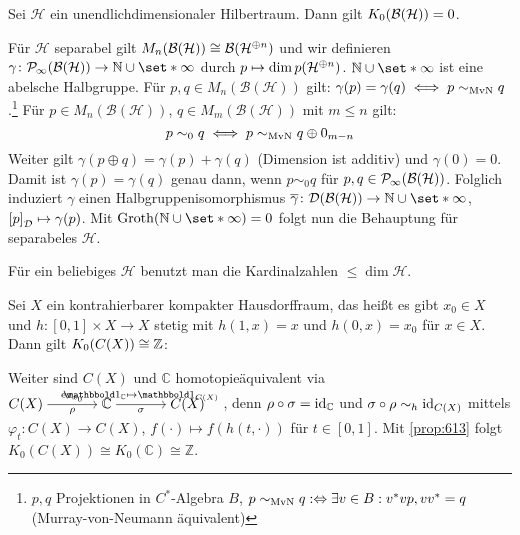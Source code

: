 \begin{beispiel}[label=618]
	Sei $\mathcal{H}$ ein unendlichdimensionaler Hilbertraum. 
	Dann gilt $K_0 \enbrace*{\mathcal{B}(\mathcal{H})}=0$.
\end{beispiel}
\begin{beweis}
	Für $\mathcal{H}$ separabel gilt $M_n(\mathcal{B}(\mathcal{H})) \cong \mathcal{B} \enbrace*{\mathcal{H}^{\oplus n}}$ und wir definieren $\gamma \colon \Pinfty(\mathcal{B}(\mathcal{H})) \to \mathbb{N} \cup \set*{\infty}$ durch $p \mapsto \dim p \enbrace*{\mathcal{H}^{\oplus n}}$.
	$\mathbb{N} \cup \set*{\infty}$ ist eine abelsche Halbgruppe.
	Für $p,q \in M_n(\mathcal{B}(\mathcal{H}))$ gilt: $\gamma(p) = \gamma(q) \iff p \sim_{\MvN} q$.\footnote{$p,q$ Projektionen in $C^*$-Algebra $B$, $p\sim_{\MvN} q : \Leftrightarrow \exists v \in B : v^*vp, vv^*=q$ (Murray-von-Neumann äquivalent)}
	Für $p \in M_n(\mathcal{B}(\mathcal{H}))$, $q \in M_m(\mathcal{B}(\mathcal{H}))$ mit $m \le n$ gilt: 
	\[
		p \sim_0 q \iff p \sim_{\MvN} q \oplus 0_{m-n}
	\]
	Weiter gilt $\gamma(p \oplus q) = \gamma(p) + \gamma(q)$ (Dimension ist additiv) und $\gamma(0)=0$.
	Damit ist $\gamma(p) = \gamma(q)$ genau dann, wenn $p\sim_0 q$ für $p,q \in \Pinfty(\mathcal{B}(\mathcal{H}))$.
	Folglich induziert $\gamma$ einen Halbgruppenisomorphismus $\overline{\gamma} \colon \mathcal{D} \enbrace*{\mathcal{B}(\mathcal{H})} \to \mathbb{N} \cup \set*{\infty}$, $\benbrace*{p}_\mathcal{D} \mapsto \gamma(p)$.
	Mit $\Groth(\mathbb{N} \cup \set*{\infty}) =0$ folgt nun die Behauptung für separabeles $\mathcal{H}$.
	
	Für ein beliebiges $\mathcal{H}$ benutzt man die Kardinalzahlen $\le \dim \mathcal{H}$.
\end{beweis}

\begin{beispiel}
	Sei $X$ ein kontrahierbarer kompakter Hausdorffraum, das heißt es gibt $x_0 \in X$ und $h \colon [0,1] \times X \to X$ stetig mit $h(1,x)=x$ und $h(0,x)=x_0$ für $x \in X$.
	Dann gilt $K_0 \enbrace*{C(X)} \cong \mathbb{Z}$:
	
	Weiter sind $C(X)$ und $\mathbb{C}$ homotopieäquivalent via \(
		\begin{tikzcd}[cramped,sep=large]
			C(X) \rar["\ev_{x_0}","\rho"'] & \mathbb{C} \rar["\ind_\mathbb{C} \mapsto \ind_{C(X)}","\sigma"'] & C(X)
		\end{tikzcd}
	\), denn $\rho \circ \sigma = \id_\mathbb{C}$ und $\sigma \circ \rho \sim_h \id_{C(X)}$ mittels $\varphi_t \colon C(X) \to C(X)$, $f(\cdot) \mapsto f(h(t,\cdot))$ für $t \in [0,1]$.
	Mit \autoref{prop:613} folgt $K_0(C(X)) \cong K_0(\mathbb{C}) \cong \mathbb{Z}$.
\end{beispiel}
\newpage

